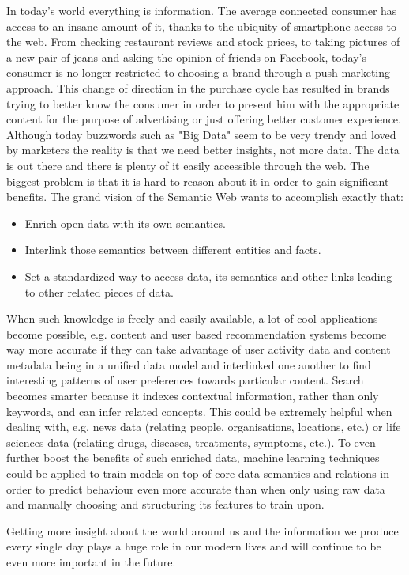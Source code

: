 In today's world everything is information. The average connected consumer has access to an insane amount of it, thanks to the ubiquity of smartphone access to the web. From checking restaurant reviews and stock prices, to taking pictures of a new pair of jeans and asking the opinion of friends on Facebook, today's consumer is no longer restricted to choosing a brand through a push marketing approach. This change of direction in the purchase cycle has resulted in brands trying to better know the consumer in order to present him with the appropriate content for the purpose of advertising or just offering better customer experience. Although today buzzwords such as "Big Data" seem to be very trendy and loved by marketers the reality is that we need better insights, not more data. The data is out there and there is plenty of it easily accessible through the web. The biggest problem is that it is hard to reason about it in order to gain significant benefits. The grand vision of the Semantic Web wants to accomplish exactly that:
\begin{itemize}
    \item Enrich open data with its own semantics.
    \item Interlink those semantics between different entities and facts.
    \item Set a standardized way to access data, its semantics and other links leading to other related pieces of data.
\end{itemize}
When such knowledge is freely and easily available, a lot of cool applications become possible, e.g. content and user based recommendation systems become way more accurate if they can take advantage of user activity data and content metadata being in a unified data model and interlinked one another to find interesting patterns of user preferences towards particular content. Search becomes smarter because it indexes contextual information, rather than only keywords, and can infer related concepts. This could be extremely helpful when dealing with, e.g. news data (relating people, organisations, locations, etc.) or life sciences data (relating drugs, diseases, treatments, symptoms, etc.). To even further boost the benefits of such enriched data, machine learning techniques could be applied to train models on top of core data semantics and relations in order to predict behaviour even more accurate than when only using raw data and manually choosing and structuring its features to train upon. 

Getting more insight about the world around us and the information we produce every single day plays a huge role in our modern lives and will continue to be even more important in the future.







